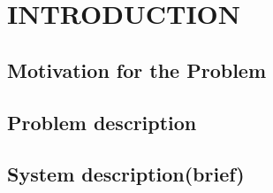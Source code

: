 \section{INTRODUCTION}
\subsection{Motivation for the Problem}
\subsection{Problem description}
\subsection{System description(brief)}